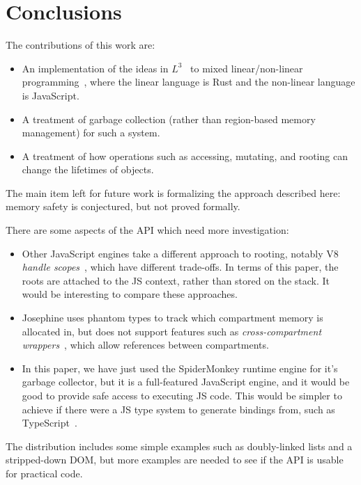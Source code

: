 \section{Conclusions}

The contributions of this work are:
\begin{itemize}

\item An implementation of the ideas in $L^3$~\cite{l3} to mixed
  linear/non-linear programming~\cite{mixed}, where the
  linear language is Rust and the non-linear language is
  JavaScript.

\item A treatment of garbage collection (rather than region-based
  memory management) for such a system.

\item A treatment of how operations such as accessing, mutating, and
  rooting can change the lifetimes of objects.
  
\end{itemize}
The main item left for future work is formalizing the approach
described here: memory safety is conjectured, but not proved
formally.

There are some aspects of the API which need more investigation:
\begin{itemize}

\item Other JavaScript engines take a different approach to
  rooting, notably V8 \emph{handle scopes}~\cite{v8-embedding},
  which have different trade-offs. In terms of this paper, the
  roots are attached to the JS context, rather than stored
  on the stack. It would be interesting to compare these approaches.

\item Josephine uses phantom types to track which compartment
  memory is allocated in, but does not support features such
  as \emph{cross-compartment wrappers}~\cite{compartments},
  which allow references between compartments.

\item In this paper, we have just used the SpiderMonkey runtime
  engine for it's garbage collector, but it is a full-featured
  JavaScript engine, and it would be good to provide safe
  access to executing JS code. This would be simpler to achieve
  if there were a JS type system to generate bindings from,
  such as TypeScript~\cite{typescript}.
  
\end{itemize}
The distribution includes some simple examples such as doubly-linked lists
and a stripped-down DOM, but more examples are needed to see if the API
is usable for practical code.
